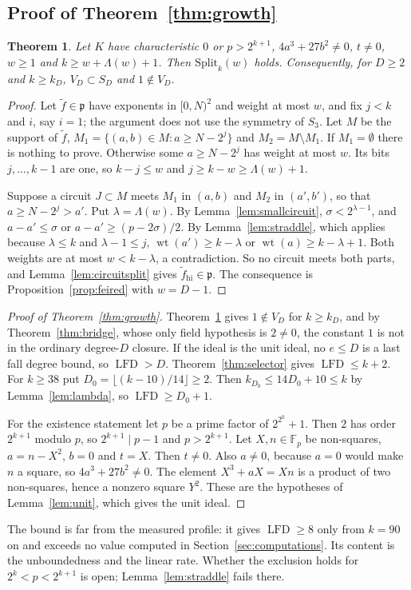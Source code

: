 \documentclass[11pt]{article}
\newtheorem{theorem}{Theorem}
\theoremstyle{definition}\newtheorem{definition}[theorem]{Definition}
\theoremstyle{remark}\newtheorem{remark}[theorem]{Remark}
\newcommand{\F}{\mathbb F}
\newcommand{\lfd}{\operatorname{LFD}}
\newcommand{\wt}{\operatorname{wt}}
\begin{document}
\subsection{Proof of Theorem~\ref{thm:growth}}\label{app:growthend}
\begin{theorem}\label{thm:feiholds}
Let $K$ have characteristic $0$ or $p>2^{k+1}$, $4a^3+27b^2\ne0$,
$t\ne0$, $w\ge1$ and $k\ge w+\Lambda(w)+1$. Then $\mathrm{Split}_k(w)$
holds. Consequently, for $D\ge2$ and $k\ge k_D$, $V_D\subset S_D$ and
$1\notin V_D$.
\end{theorem}
\begin{proof}
Let $\tilde f\in\mathfrak p$ have exponents in $[0,N)^2$ and weight at
most $w$, and fix $j<k$ and $i$, say $i=1$; the argument does not use the
symmetry of $S_3$. Let $M$ be the support of $\tilde f$,
$M_1=\{(a,b)\in M:a\ge N-2^j\}$ and $M_2=M\setminus M_1$. If
$M_1=\emptyset$ there is nothing to prove. Otherwise some $a\ge N-2^j$
has weight at most $w$. Its bits $j,\ldots,k-1$ are one, so $k-j\le w$
and $j\ge k-w\ge\Lambda(w)+1$.

Suppose a circuit $J\subset M$ meets $M_1$ in $(a,b)$ and $M_2$ in
$(a',b')$, so that $a\ge N-2^j>a'$. Put $\lambda=\Lambda(w)$. By
Lemma~\ref{lem:smallcircuit}, $\sigma<2^{\lambda-1}$, and
$a-a'\le\sigma$ or $a-a'\ge(p-2\sigma)/2$. By Lemma~\ref{lem:straddle},
which applies because $\lambda\le k$ and $\lambda-1\le j$,
$\wt(a')\ge k-\lambda$ or $\wt(a)\ge k-\lambda+1$. Both weights are at
most $w<k-\lambda$, a contradiction. So no circuit meets both parts, and
Lemma~\ref{lem:circuitsplit} gives $\tilde f_{\mathrm{hi}}\in\mathfrak p$.
The consequence is Proposition~\ref{prop:feired} with $w=D-1$.
\end{proof}

\begin{proof}[Proof of Theorem~\ref{thm:growth}]
Theorem~\ref{thm:feiholds} gives $1\notin V_D$ for $k\ge k_D$, and by
Theorem~\ref{thm:bridge}, whose only field hypothesis is $2\ne0$, the
constant $1$ is not in the ordinary degree-$D$ closure. If the ideal is
the unit ideal, no $e\le D$ is a last fall degree bound, so $\lfd>D$.
Theorem~\ref{thm:selector} gives $\lfd\le k+2$. For $k\ge38$ put
$D_0=\lfloor(k-10)/14\rfloor\ge2$. Then $k_{D_0}\le14D_0+10\le k$ by
Lemma~\ref{lem:lambda}, so $\lfd\ge D_0+1$.

For the existence statement let $p$ be a prime factor of $2^{2^k}+1$.
Then $2$ has order $2^{k+1}$ modulo $p$, so $2^{k+1}\mid p-1$ and
$p>2^{k+1}$. Let $X,n\in\F_p$ be non-squares, $a=n-X^2$, $b=0$ and $t=X$.
Then $t\ne0$. Also $a\ne0$, because $a=0$ would make $n$ a square, so
$4a^3+27b^2\ne0$. The element $X^3+aX=Xn$ is a product of two
non-squares, hence a nonzero square $Y^2$. These are the hypotheses of
Lemma~\ref{lem:unit}, which gives the unit ideal.
\end{proof}
The bound is far from the measured profile: it gives $\lfd\ge8$ only from
$k=90$ on and exceeds no value computed in Section~\ref{sec:computations}.
Its content is the unboundedness and the linear rate. Whether the
exclusion holds for $2^k<p<2^{k+1}$ is open; Lemma~\ref{lem:straddle}
fails there.
\end{document}
